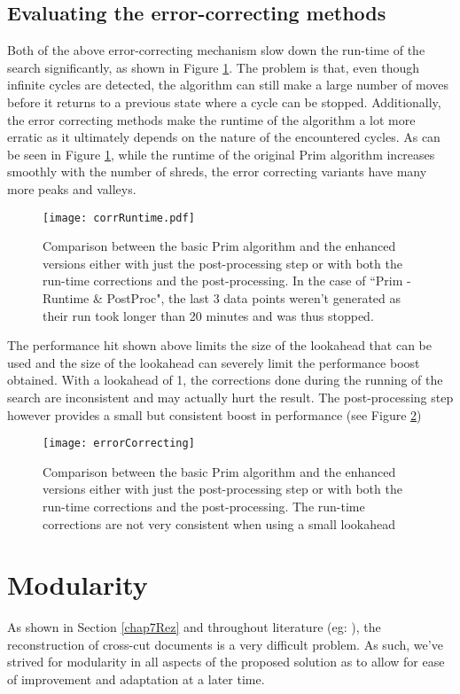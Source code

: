 \subsection{Evaluating the error-correcting methods}
Both of the above error-correcting mechanism slow down the run-time of the search significantly, as shown in Figure \ref{fig:corrScal}. The problem is that, even though infinite cycles are detected, the algorithm can still make a large number of moves before it returns to a previous state where a cycle can be stopped. Additionally, the error correcting methods make the runtime of the algorithm a lot more erratic as it ultimately depends on the nature of the encountered cycles. As can be seen in Figure \ref{fig:corrScal}, while the runtime of the original Prim algorithm increases smoothly with the number of shreds, the error correcting variants have many more peaks and valleys.
\begin{figure}[h]
  \centering
  \texttt{[image: corrRuntime.pdf]}
  \caption{Comparison between the basic Prim algorithm and the enhanced versions either with just the post-processing step or with both the run-time corrections and the post-processing. In the case of ``Prim - Runtime \& PostProc", the last 3 data points weren't generated as their run took longer than 20 minutes and was thus stopped.}
  \label{fig:corrScal}
\end{figure}

The performance hit shown above limits the size of the lookahead that can be used and the size of the lookahead can severely limit the performance boost obtained. With a lookahead of 1, the corrections done during the running of the search are inconsistent and may actually hurt the result. The post-processing step however provides a small but consistent boost in performance (see Figure \ref{fig:errorCorrecting})

\begin{figure}[h]
  \centering
  \texttt{[image: errorCorrecting]}
  \caption{Comparison between the basic Prim algorithm and the enhanced versions either with just the post-processing step or with both the run-time corrections and the post-processing. The run-time corrections are not very consistent when using a small lookahead}
  \label{fig:errorCorrecting}
\end{figure}

\section{Modularity}
\label{chap5Mod}
As shown in Section \ref{chap7Rez} and throughout literature (eg: \cite{P2,P7,P34}), the reconstruction of cross-cut documents is a very difficult problem. As such, we've strived for modularity in all aspects of the proposed solution as to allow for ease of improvement and adaptation at a later time. 

